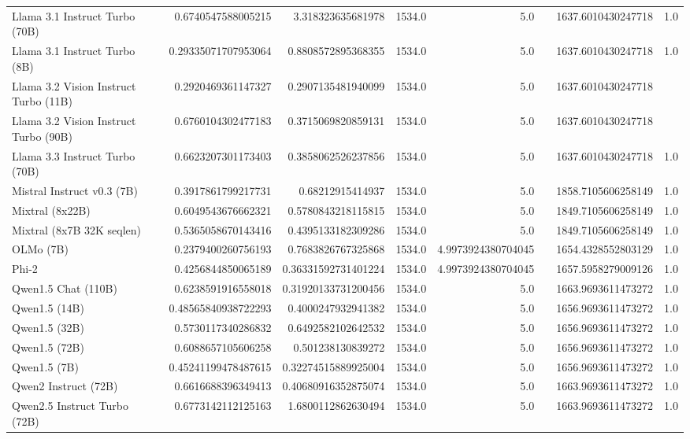 \begin{table}[htp]
{\begin{tabular}{lrrrrrrr}
Llama 3.1 Instruct Turbo (70B) & 0.6740547588005215 & 3.318323635681978 & 1534.0 & 5.0 &  & 1637.6010430247718 & 1.0 \\
Llama 3.1 Instruct Turbo (8B) & 0.29335071707953064 & 0.8808572895368355 & 1534.0 & 5.0 &  & 1637.6010430247718 & 1.0 \\
Llama 3.2 Vision Instruct Turbo (11B) & 0.2920469361147327 & 0.2907135481940099 & 1534.0 & 5.0 &  & 1637.6010430247718 &  \\
Llama 3.2 Vision Instruct Turbo (90B) & 0.6760104302477183 & 0.3715069820859131 & 1534.0 & 5.0 &  & 1637.6010430247718 &  \\
Llama 3.3 Instruct Turbo (70B) & 0.6623207301173403 & 0.3858062526237856 & 1534.0 & 5.0 &  & 1637.6010430247718 & 1.0 \\
Mistral Instruct v0.3 (7B) & 0.3917861799217731 & 0.68212915414937 & 1534.0 & 5.0 &  & 1858.7105606258149 & 1.0 \\
Mixtral (8x22B) & 0.6049543676662321 & 0.5780843218115815 & 1534.0 & 5.0 &  & 1849.7105606258149 & 1.0 \\
Mixtral (8x7B 32K seqlen) & 0.5365058670143416 & 0.4395133182309286 & 1534.0 & 5.0 &  & 1849.7105606258149 & 1.0 \\
OLMo (7B) & 0.2379400260756193 & 0.7683826767325868 & 1534.0 & 4.9973924380704045 &  & 1654.4328552803129 & 1.0 \\
Phi-2 & 0.4256844850065189 & 0.36331592731401224 & 1534.0 & 4.9973924380704045 &  & 1657.5958279009126 & 1.0 \\
Qwen1.5 Chat (110B) & 0.6238591916558018 & 0.31920133731200456 & 1534.0 & 5.0 &  & 1663.9693611473272 & 1.0 \\
Qwen1.5 (14B) & 0.48565840938722293 & 0.4000247932941382 & 1534.0 & 5.0 &  & 1656.9693611473272 & 1.0 \\
Qwen1.5 (32B) & 0.5730117340286832 & 0.6492582102642532 & 1534.0 & 5.0 &  & 1656.9693611473272 & 1.0 \\
Qwen1.5 (72B) & 0.6088657105606258 & 0.501238130839272 & 1534.0 & 5.0 &  & 1656.9693611473272 & 1.0 \\
Qwen1.5 (7B) & 0.45241199478487615 & 0.32274515889925004 & 1534.0 & 5.0 &  & 1656.9693611473272 & 1.0 \\
Qwen2 Instruct (72B) & 0.6616688396349413 & 0.40680916352875074 & 1534.0 & 5.0 &  & 1663.9693611473272 & 1.0 \\
Qwen2.5 Instruct Turbo (72B) & 0.6773142112125163 & 1.6800112862630494 & 1534.0 & 5.0 &  & 1663.9693611473272 & 1.0 \\

\end{tabular}}
\end{table}
